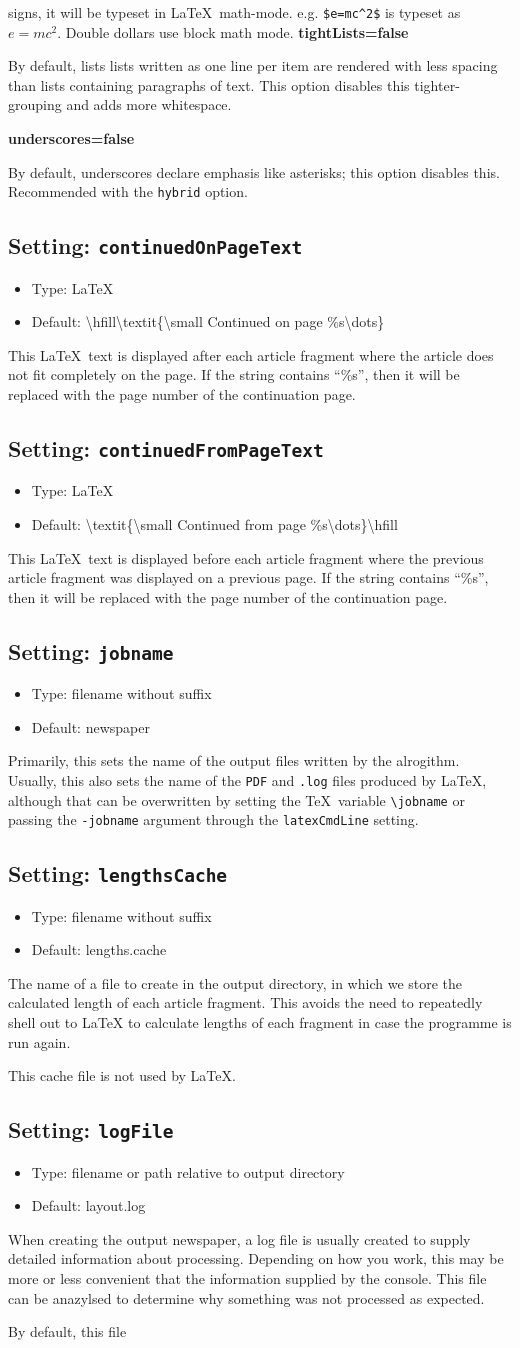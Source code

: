 \documentclass[a4paper,DIV=11]{scrartcl}
\newcommand{\deft}[2]{\nopagebreak\noindent\hspace{0.5in}\textbf{#1}\par\noindent{}#2\pagebreak[1]\par}
\newcommand{\property}[5]{
  \subsection{#1: \texttt{#2}}
  \begin{itemize}
  \item Type: #3
  \item Default: #4
  \end{itemize}
  #5
}
\newcommand{\setting}{\property{Setting}}
\begin{document}
\begin{multicols}{2}
{{      signs, it will be typeset in
      \LaTeX\ math-mode. e.g. \texttt{\$e=mc\textasciicircum2\$} is typeset as
      $e=mc^2$. Double dollars use block math mode.}
    \deft{tightLists=false}{By default, lists lists written as one
      line per item are rendered with less spacing than lists containing paragraphs of
      text. This option disables this tighter-grouping and adds more
      whitespace.}
    \deft{underscores=false}{By default, underscores declare emphasis
      like asterisks; this option disables this. Recommended with the
      \texttt{hybrid} option.}
}
\setting{continuedOnPageText}{\LaTeX}{\textbackslash hfill\textbackslash textit\{\textbackslash small Continued
    on page \%s\textbackslash dots\}}{
  This \LaTeX\ text is displayed after each article fragment where the
  article does not fit completely on the page. If the string contains
  ``\%s'', then it will be replaced with the page number of the
  continuation page.
}
\setting{continuedFromPageText}{\LaTeX}{\textbackslash textit\{\textbackslash small Continued
  from page \%s\textbackslash dots\}\textbackslash hfill}{
  This \LaTeX\ text is displayed before each article fragment where the
  previous article fragment was displayed on a previous page. If the
  string contains ``\%s'', then it will be replaced with the page
  number of the continuation page.
}
\setting{jobname}{filename without suffix}{newspaper}{Primarily, this
  sets the name of the output files written by the alrogithm. Usually,
  this also sets the name of the \texttt{PDF} and \texttt{.log} files
  produced by \LaTeX, although that can be overwritten by setting the
  \TeX\ variable \texttt{\textbackslash jobname} or passing the
  \texttt{-jobname} argument through the \texttt{latexCmdLine}
  setting.}
\setting{lengthsCache}{filename without suffix}{lengths.cache}{
  The name of a file to create in the output directory, in which we
  store the calculated length of each article fragment. This avoids
  the need to repeatedly shell out to LaTeX to calculate lengths of
  each fragment in case the programme is run again.\par
  This cache file is not used by \LaTeX.
 }
\setting{logFile}{filename or path relative to output directory}{layout.log}{
  When creating the output newspaper, a log file is usually created to
  supply detailed information about processing. Depending on how you
  work, this may be more or less convenient that the information
  supplied by the console. This file can be anazylsed to determine why
  something was not processed as expected.\par By default, this file
}
\end{multicols}
\end{document}
